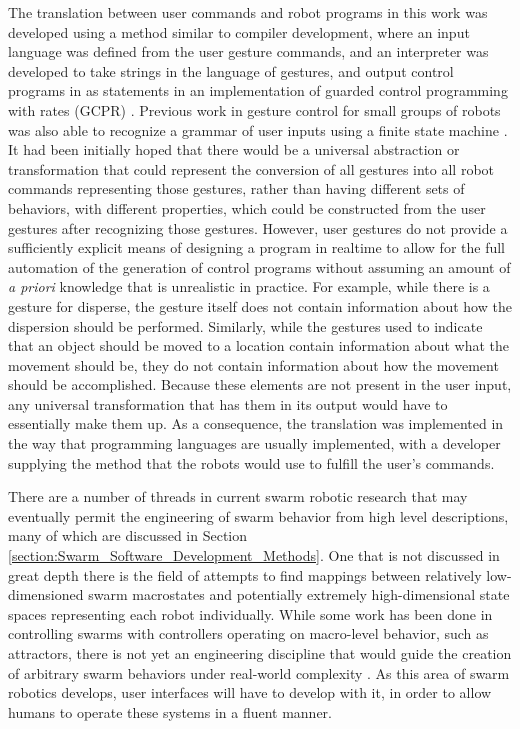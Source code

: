 The translation between user commands and robot programs in this work was developed using a method similar to compiler development, where an input language was defined from the user gesture commands, and an interpreter was developed to take strings in the language of gestures, and output control programs in as statements in an implementation of guarded control programming with rates (GCPR) \citep{napp2011compositional}.  
Previous work in gesture control for small groups of robots was also able to recognize a grammar of user inputs using a finite state machine \citep{micire2010multi}.
It had been initially hoped that there would be a universal abstraction or transformation that could represent the conversion of all gestures into all robot commands representing those gestures, rather than having different sets of behaviors, with different properties, which could be constructed from the user gestures after recognizing those gestures. 
However, user gestures do not provide a sufficiently explicit means of designing a program in realtime to allow for the full automation of the generation of control programs without assuming an amount of \emph{a priori} knowledge that is unrealistic in practice. 
For example, while there is a gesture for disperse, the gesture itself does not contain information about how the dispersion should be performed. 
Similarly, while the gestures used to indicate that an object should be moved to a location contain information about what the movement should be, they do not contain information about how the movement should be accomplished. 
Because these elements are not present in the user input, any universal transformation that has them in its output would have to essentially make them up. 
As a consequence, the translation was implemented in the way that programming languages are usually implemented, with a developer supplying the method that the robots would use to fulfill the user's commands. 

There are a number of threads in current swarm robotic research that may eventually permit the engineering of swarm behavior from high level descriptions, many of which are discussed in Section \ref{section:Swarm_Software_Development_Methods}. 
One that is not discussed in great depth there is the field of attempts to find mappings between relatively low-dimensioned swarm macrostates and potentially extremely high-dimensional state spaces representing each robot individually. 
While some work has been done in controlling swarms with controllers operating on macro-level behavior, such as attractors, there is not yet an engineering discipline that would guide the creation of arbitrary swarm behaviors under real-world complexity \citep{brown2014human}. 
As this area of swarm robotics develops, user interfaces will have to develop with it, in order to allow humans to operate these systems in a fluent manner. 

